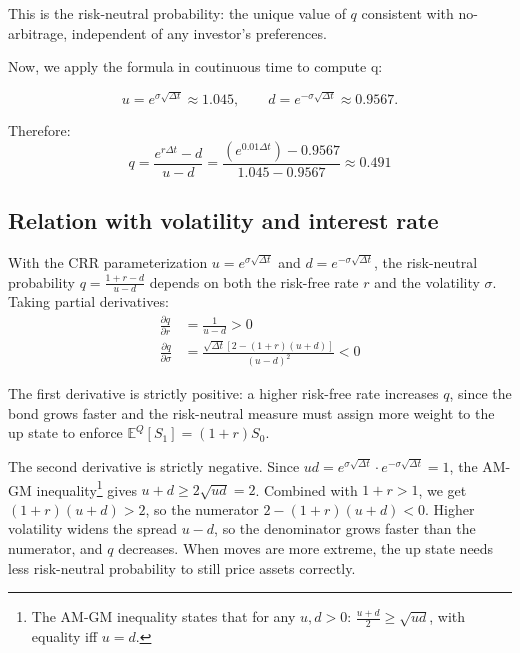 \documentclass[12pt, a4paper]{article}
\begin{document}
\noindent This is the risk-neutral probability: the unique value of $q$ consistent with no-arbitrage, independent of any investor's preferences. 
\vspace{1em}

\noindent Now, we apply the formula in coutinuous time to compute q:

\begin{equation}
  u = e^{\sigma \sqrt{\Delta t}} \approx 1.045,
  \qquad
  d = e^{-\sigma \sqrt{\Delta t}} \approx 0.9567.
  \label{eq:up and down}
\end{equation}

Therefore:
\[
q=\frac{e^{r\Delta t}-d}{u-d} = \frac{(e^{0.01 \Delta t}) - 0.9567}{1.045 - 0.9567} \approx 0.491
\]
\vspace{1em}


\subsection{Relation with volatility and interest rate}

\noindent With the CRR parameterization $u = e^{\sigma\sqrt{\Delta t}}$ and $d = e^{-\sigma\sqrt{\Delta t}}$, the
risk-neutral probability $q = \frac{1+r-d}{u-d}$ depends on both the risk-free rate $r$ and the
volatility $\sigma$. Taking partial derivatives:
\begin{align*}
\frac{\partial q}{\partial r} &= \frac{1}{u-d} > 0 \\[6pt]
\frac{\partial q}{\partial \sigma} &= \frac{\sqrt{\Delta t}\left[2 - (1+r)(u+d)\right]}{(u-d)^2} < 0
\end{align*}

\noindent The first derivative is strictly positive: a higher risk-free rate increases $q$, since the
bond grows faster and the risk-neutral measure must assign more weight to the up state to
enforce $\mathbb{E}^Q[S_1] = (1+r)S_0$.
\vspace{0.5em}

\noindent The second derivative is strictly negative. Since $ud = e^{\sigma\sqrt{\Delta t}} \cdot
e^{-\sigma\sqrt{\Delta t}} = 1$, the AM-GM inequality\footnote{The AM-GM inequality states
that for any $u, d > 0$: $\frac{u+d}{2} \geq \sqrt{ud}$, with equality iff $u = d$.} gives
$u + d \geq 2\sqrt{ud} = 2$. Combined with $1+r > 1$, we get $(1+r)(u+d) > 2$, so the
numerator $2 - (1+r)(u+d) < 0$. Higher volatility widens the spread $u - d$, so the
denominator grows faster than the numerator, and $q$ decreases. When moves are
more extreme, the up state needs less risk-neutral probability to still price assets correctly.
\vspace{3em}
\end{document}
